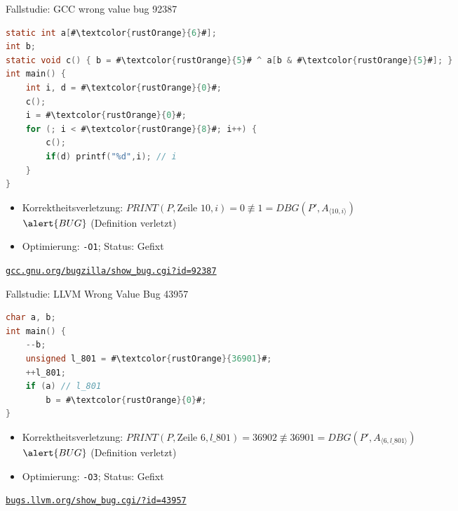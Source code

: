 ﻿\documentclass{beamer}
\begin{document}
\begin{frame}[fragile]{Fallstudie: GCC wrong value bug 92387}
  \begin{lstlisting}[language=C,basicstyle=\ttfamily\tiny,escapechar=\#]
static int a[#\textcolor{rustOrange}{6}#];
int b;
static void c() { b = #\textcolor{rustOrange}{5}# ^ a[b & #\textcolor{rustOrange}{5}#]; }
int main() {
    int i, d = #\textcolor{rustOrange}{0}#;
    c();
    i = #\textcolor{rustOrange}{0}#;
    for (; i < #\textcolor{rustOrange}{8}#; i++) {
        c();
        if(d) printf("%d",i); // i
    }
}
  \end{lstlisting}
  \begin{itemize}
    \item Korrektheitsverletzung: $\mathit{PRINT}(P,\text{Zeile }10,i) = 0 \not\equiv 1 = \mathit{DBG}(P', A_{\langle 10,i\rangle})$ \\
    $\alert{BUG}$ (Definition verletzt)
    \item Optimierung: \texttt{-O1}; Status: Gefixt
  \end{itemize}
  \begin{center}
    \href{https://gcc.gnu.org/bugzilla/show_bug.cgi?id=92387}{\texttt{gcc.gnu.org/bugzilla/show\_bug.cgi?id=92387}}
  \end{center}
\end{frame}

\begin{frame}[fragile]{Fallstudie: LLVM Wrong Value Bug 43957}
  \begin{lstlisting}[language=C,basicstyle=\ttfamily\tiny,escapechar=\#]
char a, b;
int main() {
    --b;
    unsigned l_801 = #\textcolor{rustOrange}{36901}#;
    ++l_801;
    if (a) // l_801
        b = #\textcolor{rustOrange}{0}#;
}
  \end{lstlisting}
  \vspace{0.3cm}
  \begin{itemize}
    \item Korrektheitsverletzung: $\mathit{PRINT}(P,\text{Zeile }6,l\_801) = 36902 \not\equiv 36901 = \mathit{DBG}(P', A_{\langle 6,l\_801\rangle})$ \\
    $\alert{BUG}$ (Definition verletzt)
    \item Optimierung: \texttt{-O3}; Status: Gefixt
  \end{itemize}
  \begin{center}
    \href{https://bugs.llvm.org/show_bug.cgi?id=43957}{\texttt{bugs.llvm.org/show\_bug.cgi/?id=43957}}
  \end{center}
\end{frame}
\end{document}
